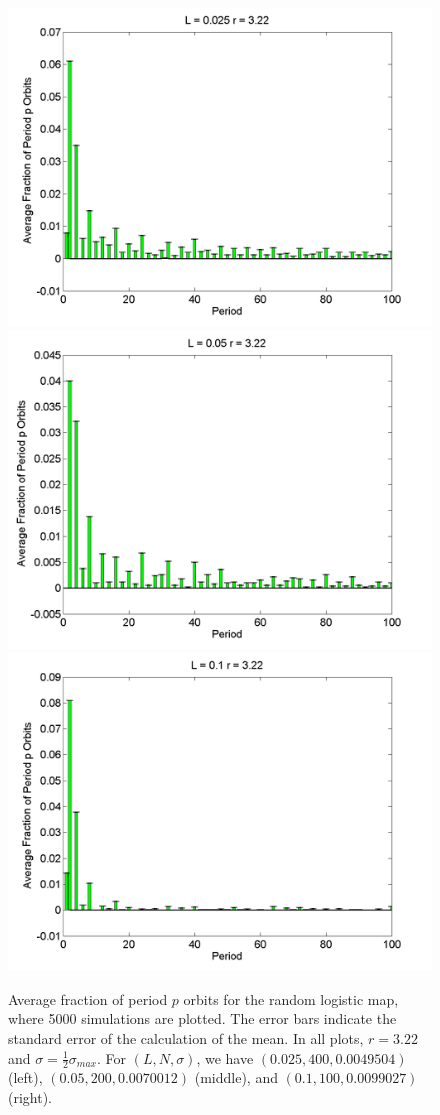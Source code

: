 \begin{figure}[H]\linespread{1}
\caption[Average fraction of period $p$ orbits for the random logistic
map, $\sigma=\frac{1}{2}\sigma_{max}$ and $r=3.22$]{Average fraction of period $p$ orbits for the random logistic
map, where 5000 simulations are plotted. The error bars indicate
the standard error of the calculation of the mean. In all plots,
$r=3.22$ and $\sigma=\frac{1}{2}\sigma_{max}$. For $(L,N,\sigma)$,
we have $(0.025, 400, 0.0049504)$ (left), $(0.05, 200, 0.0070012)$
(middle), and $(0.1, 100, 0.0099027)$ (right).}\label{fig:rloghist_hs}
	\begin{center}
\includegraphics[width=.33\textwidth]{figs/rlog_hist_hs_L_0025_r_322_s_00049504_a_30632e-07_sims_5000.png}\hfill		\includegraphics[width=.33\textwidth]{figs/rlog_hist_hs_L_005_r_322_s_00070012_a_12252e-06_sims_5000.png}\hfill
\includegraphics[width=.33\textwidth]{figs/rlog_hist_hs_L_01_r_322_s_00099027_a_48991e-06_sims_5000.png}
	\end{center}
\end{figure}

